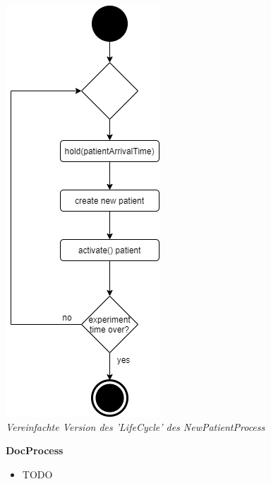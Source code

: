 \documentclass{article}
\begin{document}
\begin{center}
\includegraphics[scale=0.8]{img/newPatientProcess.png} \\
\textit{Vereinfachte Version des 'LifeCycle' des NewPatientProcess}
\end{center}
\textbf{DocProcess}
\begin{itemize}
    \item TODO
\end{itemize}
\end{document}
